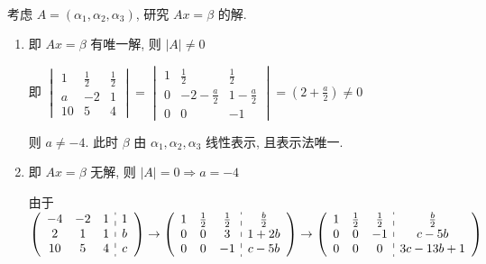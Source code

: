 	 \paragraph{} %
		 考虑 \( A = (\alpha_{1}, \alpha_{2}, \alpha_{3}) \), 研究 \( Ax = \beta \) 的解.
		 \begin{enumerate}
			 \item %
			       即 \( Ax = \beta \) 有唯一解, 则 \( |A| \neq 0 \)

			       即 \( \begin{vmatrix}
				       1  & \frac{1}{2} & \frac{1}{2} \\
				       a  & -2          & 1           \\
				       10 & 5           & 4
			       \end{vmatrix} = \begin{vmatrix}
				       1 & \frac{1}{2}    & \frac{1}{2}   \\
				       0 & -2-\frac{a}{2} & 1-\frac{a}{2} \\
				       0 & 0              & -1
			       \end{vmatrix} = (2+\frac{a}{2}) \neq 0 \)

			       则 \( a \neq -4 \). 此时 \( \beta \) 由 \( \alpha_{1}, \alpha_{2}, \alpha_{3} \) 线性表示, 且表示法唯一.
			 \item %
			       即 \( Ax = \beta \) 无解, 则 \( |A| = 0 \Rightarrow a = -4 \)

			       由于 \( \left(\begin{array}{ccc:c}
					       -4 & -2 & 1 & 1 \\
					       2  & 1  & 1 & b \\
					       10 & 5  & 4 & c
				       \end{array}\right)
			       \to
			       \left(\begin{array}{ccc:c}
					       1 & \frac{1}{2} & \frac{1}{2} & \frac{b}{2} \\
					       0 & 0           & 3           & 1+2b        \\
					       0 & 0           & -1          & c-5b
				       \end{array}\right)
			       \to
			       \left(\begin{array}{ccc:c}
					       1 & \frac{1}{2} & \frac{1}{2} & \frac{b}{2} \\
					       0 & 0           & -1          & c-5b        \\
					       0 & 0           & 0           & 3c-13b+1
				       \end{array}\right) \)


\end{enumerate}
